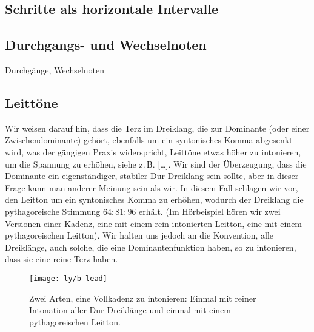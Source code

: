 
\subsection{Schritte als horizontale Intervalle}

\subsection{Durchgangs- und Wechselnoten}

Durchgänge, Wechselnoten

\subsection{Leittöne}
\label{sec:ln}

Wir weisen darauf hin, dass die Terz im Dreiklang, die zur Dominante (oder einer
Zwischendominante) gehört, ebenfalls um ein syntonisches Komma abgesenkt wird,
was der gängigen Praxis widerspricht, Leittöne etwas höher zu intonieren, um die
Spannung zu erhöhen, siehe z.\,B. […]. Wir sind der Überzeugung,
dass die Dominante ein eigenständiger, stabiler Dur-Dreiklang sein sollte, aber
in dieser Frage kann man anderer Meinung sein als wir. In diesem Fall schlagen
wir vor, den Leitton um ein syntonisches Komma zu erhöhen, wodurch der Dreiklang
die pythagoreische Stimmung $64:81:96$ erhält. (Im Hörbeispiel hören wir zwei
Versionen einer Kadenz, eine mit einem rein intonierten Leitton, eine mit einem
pythagoreischen Leitton). Wir halten uns jedoch an die Konvention, alle
Dreiklänge, auch solche, die eine Dominantenfunktion haben, so zu intonieren,
dass sie eine reine Terz haben.

\begin{figure}
  \centering
  \texttt{[image: ly/b-lead]}
  \caption{Zwei Arten, eine Vollkadenz zu intonieren: Einmal mit reiner
  	Intonation aller Dur-Dreiklänge und einmal mit einem pythagoreischen
  	Leitton.}\label{fig:lead}
\end{figure}


